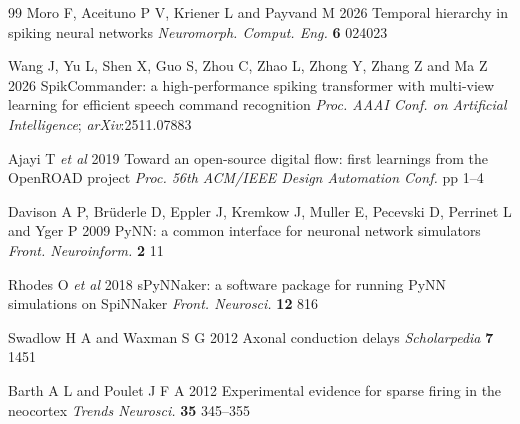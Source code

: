 \documentclass{iopjournal}
\begin{document}
\begin{thebibliography}{99}
 Moro F, Aceituno P V, Kriener L and Payvand M 2026 Temporal hierarchy in spiking neural networks \textit{Neuromorph. Comput. Eng.} \textbf{6} 024023

 Wang J, Yu L, Shen X, Guo S, Zhou C, Zhao L, Zhong Y, Zhang Z and Ma Z 2026 SpikCommander: a high-performance spiking transformer with multi-view learning for efficient speech command recognition \textit{Proc. AAAI Conf. on Artificial Intelligence}; \textit{arXiv}:2511.07883

 Ajayi T \textit{et al} 2019 Toward an open-source digital flow: first learnings from the OpenROAD project \textit{Proc. 56th ACM/IEEE Design Automation Conf.} pp 1--4

 Davison A P, Br\"{u}derle D, Eppler J, Kremkow J, Muller E, Pecevski D, Perrinet L and Yger P 2009 PyNN: a common interface for neuronal network simulators \textit{Front. Neuroinform.} \textbf{2} 11

 Rhodes O \textit{et al} 2018 sPyNNaker: a software package for running PyNN simulations on SpiNNaker \textit{Front. Neurosci.} \textbf{12} 816

 Swadlow H A and Waxman S G 2012 Axonal conduction delays \textit{Scholarpedia} \textbf{7} 1451

 Barth A L and Poulet J F A 2012 Experimental evidence for sparse firing in the neocortex \textit{Trends Neurosci.} \textbf{35} 345--355

\end{thebibliography}
\end{document}
